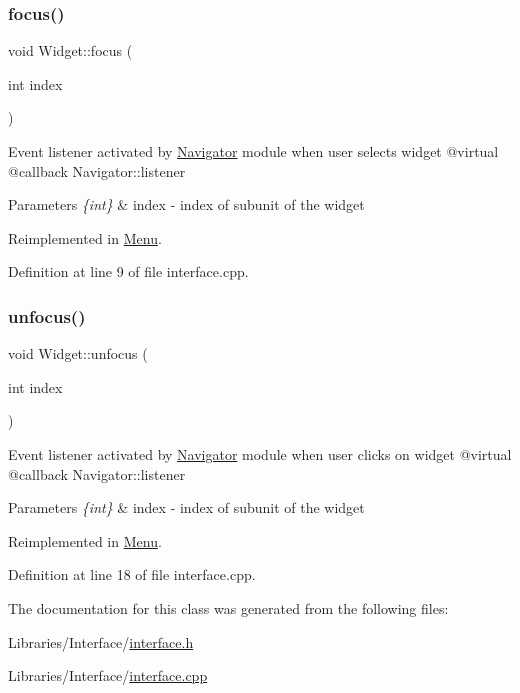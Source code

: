 \subsubsection{\texorpdfstring{focus()}{focus()}}
{\footnotesize\ttfamily void Widget\+::focus (\begin{DoxyParamCaption}\item[{int}]{index }\end{DoxyParamCaption})\hspace{0.3cm}{\ttfamily [virtual]}}

Event listener activated by \mbox{\hyperlink{class_navigator}{Navigator}} module when user selects widget @virtual @callback Navigator\+::listener 
\begin{DoxyParams}{Parameters}
{\em \{int\}} & index -\/ index of subunit of the widget \\
\hline
\end{DoxyParams}


Reimplemented in \mbox{\hyperlink{class_menu_ac5ec365a1916cc9cbd233063544588d7}{Menu}}.



Definition at line 9 of file interface.\+cpp.

\mbox{\label{class_widget_a65f349812facca8302957a83b161a840}} 
\subsubsection{\texorpdfstring{unfocus()}{unfocus()}}
{\footnotesize\ttfamily void Widget\+::unfocus (\begin{DoxyParamCaption}\item[{int}]{index }\end{DoxyParamCaption})\hspace{0.3cm}{\ttfamily [virtual]}}

Event listener activated by \mbox{\hyperlink{class_navigator}{Navigator}} module when user clicks on widget @virtual @callback Navigator\+::listener 
\begin{DoxyParams}{Parameters}
{\em \{int\}} & index -\/ index of subunit of the widget \\
\hline
\end{DoxyParams}


Reimplemented in \mbox{\hyperlink{class_menu_acc8b2492f87ebc9219eaad0fe0ecaa5c}{Menu}}.



Definition at line 18 of file interface.\+cpp.



The documentation for this class was generated from the following files\+:\begin{DoxyCompactItemize}
\item 
Libraries/\+Interface/\mbox{\hyperlink{interface_8h}{interface.\+h}}\item 
Libraries/\+Interface/\mbox{\hyperlink{interface_8cpp}{interface.\+cpp}}\end{DoxyCompactItemize}
